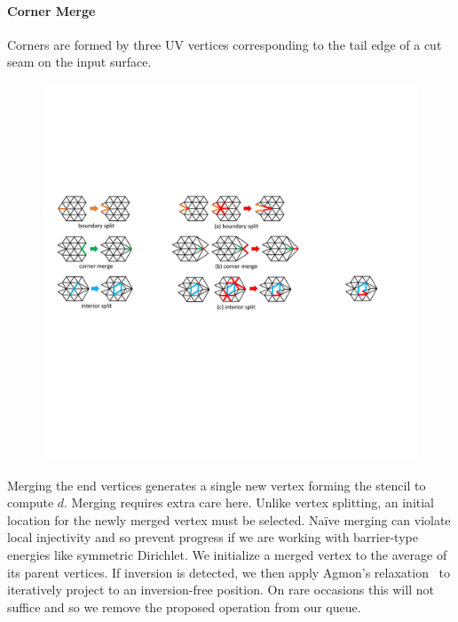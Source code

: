 \paragraph{Corner Merge}
Corners are formed by three UV vertices corresponding to the tail edge of a cut seam on the input surface. 
\begin{figure}
  \begin{center}
  \vspace{-5mm}
    \includegraphics[width=1\linewidth]{fig/cMerge}
  \vspace{-4mm}
  \end{center}
\end{figure}
Merging the end vertices generates a single new vertex forming the stencil to compute $d$. Merging requires extra care here. Unlike vertex splitting, an initial location for the newly merged vertex must be selected. Na\"ive merging can violate local injectivity and so prevent progress if we are working with barrier-type energies like symmetric Dirichlet. We initialize a merged vertex to the average of its parent vertices. If inversion is detected, we then apply Agmon's relaxation~ to iteratively project to an inversion-free position. On rare occasions this will not suffice and so we remove the proposed operation from our queue.

